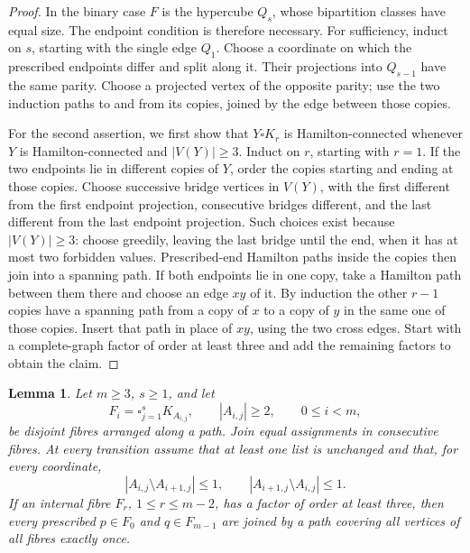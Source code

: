 \documentclass[11pt]{article}
\newtheorem{lemma}[theorem]{Lemma}
\theoremstyle{remark}
\numberwithin{equation}{section}
\numberwithin{table}{section}
\begin{document}
\begin{proof}
In the binary case $F$ is the hypercube $Q_s$, whose bipartition
classes have equal size.  The endpoint condition is therefore necessary.
For sufficiency, induct on $s$, starting with the single edge $Q_1$.
Choose a coordinate on which the prescribed endpoints differ and split
along it.  Their projections into $Q_{s-1}$ have the same parity.  Choose
a projected vertex of the opposite parity; use the two induction paths
to and from its copies, joined by the edge between those copies.

For the second assertion, we first show that $Y\square K_r$ is
Hamilton-connected whenever $Y$ is Hamilton-connected and
$|V(Y)|\ge3$.  Induct on $r$, starting with $r=1$.  If the two
endpoints lie in different copies of $Y$, order the copies starting and
ending at those copies.  Choose successive bridge vertices in $V(Y)$,
with the first different from the first endpoint projection, consecutive
bridges different, and the last different from the last endpoint
projection.  Such choices exist because $|V(Y)|\ge3$: choose greedily,
leaving the last bridge until the end, when it has at most two forbidden
values.  Prescribed-end Hamilton paths inside the copies then join into
a spanning path.  If both endpoints lie in one copy, take a Hamilton
path between them there and choose an edge $xy$ of it.  By induction the
other $r-1$ copies have a spanning path from a copy of $x$ to a copy of
$y$ in the same one of those copies.  Insert that path in place of
$xy$, using the two cross edges.  Start with a complete-graph factor of
order at least three and add the remaining factors to obtain the claim.
\end{proof}

\begin{lemma}
\label{lem:path-fibre}
Let $m\ge3$, $s\ge1$, and let
\[
 F_i=\square_{j=1}^s K_{A_{i,j}},\qquad |A_{i,j}|\ge2,
 \qquad 0\le i<m,
\]
be disjoint fibres arranged along a path.  Join equal assignments in
consecutive fibres.  At every transition assume that at least one list
is unchanged and that, for every coordinate,
\[
 |A_{i,j}\setminus A_{i+1,j}|\le1,
 \qquad |A_{i+1,j}\setminus A_{i,j}|\le1.
\]
If an internal fibre $F_r$, $1\le r\le m-2$, has a factor of order
at least three, then every prescribed $p\in F_0$ and $q\in F_{m-1}$
are joined by a path covering all vertices of all fibres exactly once.
\end{lemma}
\end{document}
